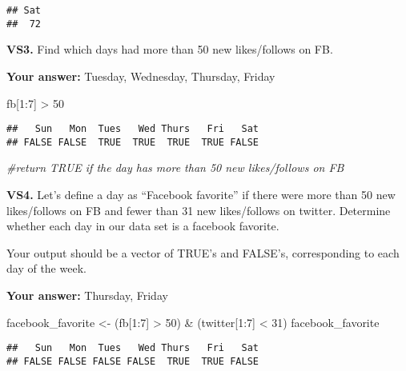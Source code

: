 \documentclass[
]{article}
\newenvironment{Shaded}{\begin{snugshade}}{\end{snugshade}}
\newcommand{\CommentTok}[1]{\textcolor[rgb]{0.56,0.35,0.01}{\textit{#1}}}
\newcommand{\DecValTok}[1]{\textcolor[rgb]{0.00,0.00,0.81}{#1}}
\newcommand{\NormalTok}[1]{#1}
\newcommand{\OtherTok}[1]{\textcolor[rgb]{0.56,0.35,0.01}{#1}}
\newcommand{\SpecialCharTok}[1]{\textcolor[rgb]{0.00,0.00,0.00}{#1}}
\begin{document}
\begin{verbatim}
## Sat 
##  72
\end{verbatim}

\textbf{VS3.} Find which days had more than 50 new likes/follows on FB.

\textbf{Your answer:} Tuesday, Wednesday, Thursday, Friday

\begin{Shaded}
\begin{Highlighting}[]
\NormalTok{fb[}\DecValTok{1}\SpecialCharTok{:}\DecValTok{7}\NormalTok{] }\SpecialCharTok{\textgreater{}} \DecValTok{50}
\end{Highlighting}
\end{Shaded}

\begin{verbatim}
##   Sun   Mon  Tues   Wed Thurs   Fri   Sat 
## FALSE FALSE  TRUE  TRUE  TRUE  TRUE FALSE
\end{verbatim}

\begin{Shaded}
\begin{Highlighting}[]
\CommentTok{\#return TRUE if the day has more than 50 new likes/follows on FB}
\end{Highlighting}
\end{Shaded}

\textbf{VS4.} Let's define a day as ``Facebook favorite'' if there were
more than 50 new likes/follows on FB and fewer than 31 new likes/follows
on twitter. Determine whether each day in our data set is a facebook
favorite.

Your output should be a vector of TRUE's and FALSE's, corresponding to
each day of the week.

\textbf{Your answer:} Thursday, Friday

\begin{Shaded}
\begin{Highlighting}[]
\NormalTok{facebook\_favorite }\OtherTok{\textless{}{-}}\NormalTok{ (fb[}\DecValTok{1}\SpecialCharTok{:}\DecValTok{7}\NormalTok{] }\SpecialCharTok{\textgreater{}} \DecValTok{50}\NormalTok{) }\SpecialCharTok{\&}\NormalTok{ (twitter[}\DecValTok{1}\SpecialCharTok{:}\DecValTok{7}\NormalTok{] }\SpecialCharTok{\textless{}} \DecValTok{31}\NormalTok{)}
\NormalTok{facebook\_favorite}
\end{Highlighting}
\end{Shaded}

\begin{verbatim}
##   Sun   Mon  Tues   Wed Thurs   Fri   Sat 
## FALSE FALSE FALSE FALSE  TRUE  TRUE FALSE
\end{verbatim}
\end{document}
